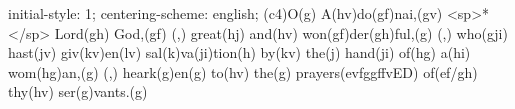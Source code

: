 initial-style: 1;
centering-scheme: english;
(c4)O(g) A(hv)do(gf)nai,(gv) <sp>*</sp> Lord(gh) God,(gf) (,) great(hj) and(hv) won(gf)der(gh)ful,(g) (,) who(gji) hast(jv) giv(kv)en(lv) sal(k)va(ji)tion(h) by(kv) the(j) hand(ji) of(hg) a(hi) wom(hg)an,(g) (,) heark(g)en(g) to(hv) the(g) prayers(evfggffvED) of(ef/gh) thy(hv) ser(g)vants.(g)
